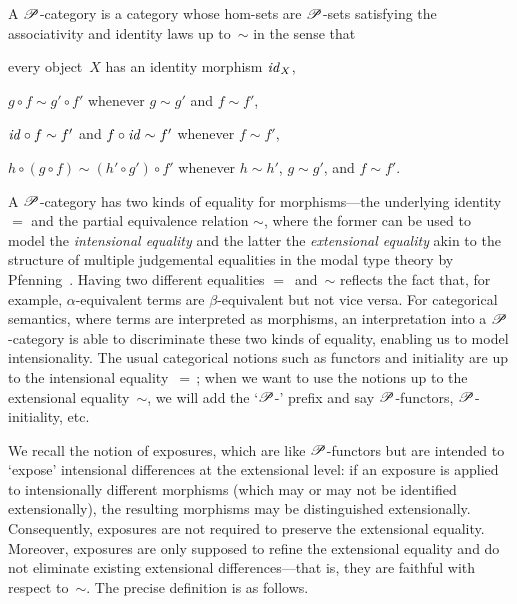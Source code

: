 \documentclass[a4paper,UKenglish,numberwithinsect,cleveref,thm-restate]{lipics-v2021}
\numberwithin{equation}{section}
\theoremstyle{definition}
\theoremstyle{plain}
\begin{document}
\begin{definition}
  A $\mathscr{P}$-category is a category whose hom-sets are $\mathscr{P}$-sets satisfying the associativity and identity laws up to~$\sim$ in the sense that 
  \begin{romanenumerate}
  \item every object~$X$ has an identity morphism $\mathit{id}_X$, 
  \item $g \circ f \sim g' \circ f'$ whenever $g\sim g'$ and $f \sim f'$,
  \item $\mathit{id} \circ f \sim f'$ and $f \circ \mathit{id} \sim f'$ whenever $f \sim f'$,
  \item $h \circ (g \circ f) \sim (h' \circ g') \circ f'$ whenever $h\sim h'$, $g \sim g'$, and $f \sim f'$.
  \end{romanenumerate}
\end{definition}

A $\mathscr{P}$-category has two kinds of equality for morphisms---the underlying identity $=$ and the partial equivalence relation $\sim$, where the former can be used to model the \emph{intensional equality} and the latter the \emph{extensional equality} akin to the structure of multiple judgemental equalities in the modal type theory by Pfenning~\cite{Pfenning2002a}.
Having two different equalities $=$~and~$\sim$ reflects the fact that, for example, $\alpha$-equivalent terms are $\beta$-equivalent but not vice versa.
For categorical semantics, where terms are interpreted as morphisms, an interpretation into a $\mathscr{P}$-category is able to discriminate these two kinds of equality, enabling us to model intensionality.
The usual categorical notions such as functors and initiality are up to the intensional equality~$=$\,; when we want to use the notions up to the extensional equality~$\sim$, we will add the `$\mathscr{P}$-' prefix and say $\mathscr{P}$-functors, $\mathscr{P}$-initiality, etc.

We recall the notion of exposures, which are like $\mathscr{P}$-functors but are intended to `expose' intensional differences at the extensional level: if an exposure is applied to intensionally different morphisms (which may or may not be identified extensionally), the resulting morphisms may be distinguished extensionally.
Consequently, exposures are not required to preserve the extensional equality.
Moreover, exposures are only supposed to refine the extensional equality and do not eliminate existing extensional differences---that is, they are faithful with respect to~$\sim$.
The precise definition is as follows.
\end{document}

